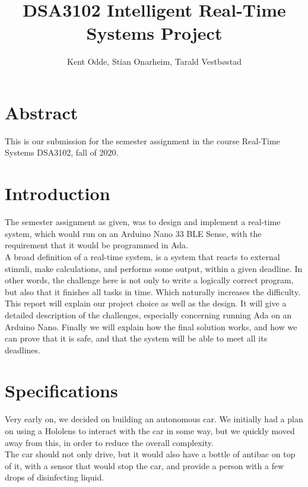 \documentclass{article}
\author{Kent Odde, Stian Onarheim, Tarald Vestbøstad}
\title{DSA3102 Intelligent Real-Time Systems Project}
\begin{document}
\maketitle

\newpage
\tableofcontents

\newpage
\section{Abstract}
This is our submission for the semester assignment in the course Real-Time Systems DSA3102, fall of 2020.

\section{Introduction}
The semester assignment as given, was to design and implement a real-time system, which would run on an Arduino Nano 33 BLE Sense, with the requirement that it would be programmed in Ada.\\

A broad definition of a real-time system, is a system that reacts to external stimuli, make calculations, and performs some output, within a given deadline. In other words, the challenge here is not only to write a logically correct program, but also that it finishes all tasks in time. Which naturally increases the difficulty.\\

This report will explain our project choice as well as the design. It will give a detailed description of the challenges, especially concerning running Ada on an Arduino Nano. Finally we will explain how the final solution works, and how we can prove that it is safe, and that the system will be able to meet all its deadlines.\\

\section{Specifications}

Very early on, we decided on building an autonomous car. We initially had a plan on using a Hololens to interact with the car in some way, but we quickly moved away from this, in order to reduce the overall complexity.\\

The car should not only drive, but it would also have a bottle of antibac on top of it, with a sensor that would stop the car, and provide a person with a few drops of disinfecting liquid.\\
\end{document}
